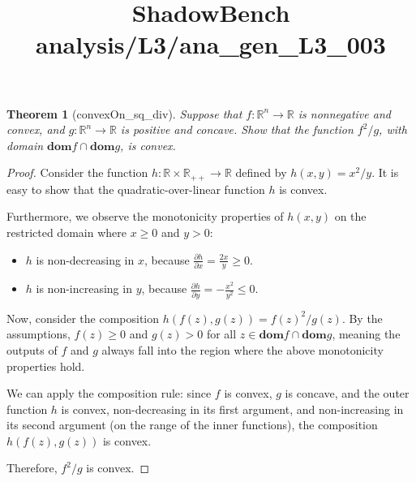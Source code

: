 \documentclass{article}
\title{ShadowBench analysis/L3/ana\_gen\_L3\_003}
\newtheorem{theorem}{Theorem}
\begin{document}
\maketitle

\begin{theorem}[convexOn_sq_div]
Suppose that $f : \mathbb{R}^n \to \mathbb{R}$ is nonnegative and convex, and $g : \mathbb{R}^n \to \mathbb{R}$ is positive and concave. Show that the function $f^2/g$, with domain $\mathbf{dom} f \cap \mathbf{dom} g$, is convex.
\end{theorem}

\begin{proof}
Consider the function $h : \mathbb{R} \times \mathbb{R}_{++} \to \mathbb{R}$ defined by $h(x, y) = x^2 / y$. 
It is easy to show that the quadratic-over-linear function $h$ is convex.

Furthermore, we observe the monotonicity properties of $h(x, y)$ on the restricted domain where $x \ge 0$ and $y > 0$:
\begin{itemize}
    \item $h$ is non-decreasing in $x$, because $\frac{\partial h}{\partial x} = \frac{2x}{y} \ge 0$.
    \item $h$ is non-increasing in $y$, because $\frac{\partial h}{\partial y} = -\frac{x^2}{y^2} \le 0$.
\end{itemize}

Now, consider the composition $h(f(z), g(z)) = f(z)^2 / g(z)$. 
By the assumptions, $f(z) \ge 0$ and $g(z) > 0$ for all $z \in \mathbf{dom} f \cap \mathbf{dom} g$, meaning the outputs of $f$ and $g$ always fall into the region where the above monotonicity properties hold.

We can apply the composition rule: since $f$ is convex, $g$ is concave, and the outer function $h$ is convex, non-decreasing in its first argument, and non-increasing in its second argument (on the range of the inner functions), the composition $h(f(z), g(z))$ is convex.

Therefore, $f^2/g$ is convex.
\end{proof}
\end{document}
